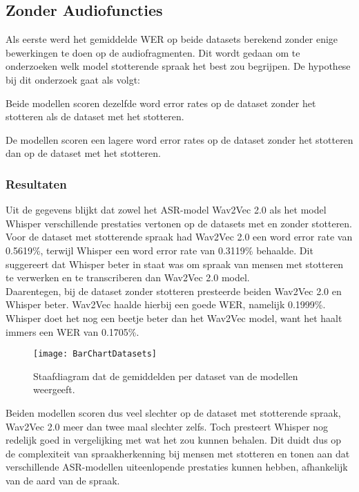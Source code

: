 \subsection{Zonder Audiofuncties}
Als eerste werd het gemiddelde WER op beide datasets berekend zonder enige bewerkingen te doen op de audiofragmenten. Dit wordt gedaan om te onderzoeken welk model stotterende spraak het best zou begrijpen. De hypothese bij dit onderzoek gaat als volgt: 
\begin{hyp}{0}
Beide modellen scoren dezelfde word error rates op de dataset zonder het stotteren als de dataset met het stotteren.
\end{hyp}
\begin{hyp}{1}
De modellen scoren een lagere word error rates op de dataset zonder het stotteren dan op de dataset met het stotteren.
\end{hyp}
\subsubsection{Resultaten}
Uit de gegevens blijkt dat zowel het ASR-model Wav2Vec 2.0 als het model Whisper verschillende prestaties vertonen op de datasets met en zonder stotteren. Voor de dataset met stotterende spraak had Wav2Vec 2.0 een word error rate van 0.5619\%, terwijl Whisper een word error rate van 0.3119\% behaalde. Dit suggereert dat Whisper beter in staat was om spraak van mensen met stotteren te verwerken en te transcriberen dan Wav2Vec 2.0 model.\\

Daarentegen, bij de dataset zonder stotteren presteerde beiden Wav2Vec 2.0 en Whisper beter. Wav2Vec haalde hierbij een goede WER, namelijk 0.1999\%. Whisper doet het nog een beetje beter dan het Wav2Vec model, want het haalt immers een WER van 0.1705\%.\\
\begin{figure}[H]
    \texttt{[image: BarChartDatasets]}
    \caption{Staafdiagram dat de gemiddelden per dataset van de modellen weergeeft.}
    \label{fig:barchart}
\end{figure}
Beiden modellen scoren dus veel slechter op de dataset met stotterende spraak, Wav2Vec 2.0 meer dan twee maal slechter zelfs. Toch presteert Whisper nog redelijk goed in vergelijking met wat het zou kunnen behalen. Dit duidt dus op de complexiteit van spraakherkenning bij mensen met stotteren en tonen aan dat verschillende ASR-modellen uiteenlopende prestaties kunnen hebben, afhankelijk van de aard van de spraak.\\

